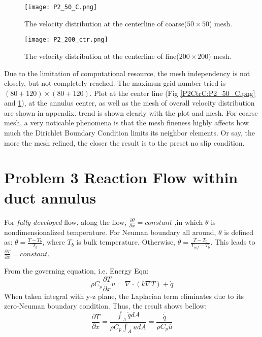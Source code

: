 \documentclass[a4paper,10pt]{report}
\begin{document}
\begin{figure}[ht]
\centering
\texttt{[image: P2\_50\_C.png]}
\caption{The velocity distribution at the centerline of coarse($50\times50$) mesh.}
\label{P2CtrC:P2_50_C.png}
\texttt{[image: P2\_200\_ctr.png]}
\caption{The velocity distribution at the centerline of fine($200 \times 200$) mesh.}
\label{P2CtrF:P2_200_ctr.png}
\end{figure}


Due to the limitation of computational resource, the mesh independency is not closely, but not completely reached. 
The maximun grid number tried is $(80+120) \times (80+120)$. Plot at the center line (Fig \ref{P2CtrC:P2_50_C.png} and 
\ref{P2CtrF:P2_200_ctr.png}), at the annulus center, as well as the mesh of overall velocity distribution are shown in appendix.
trend is shown clearly with the plot and mesh. 
For coarse mesh, a very noticable phenomena is that the mesh fineness highly affects how much the Dirichlet Boundary 
Condition limits its neighbor elements. Or say, the more the mesh refined, the closer the result is to the preset 
no slip condition.


\section{Problem 3 Reaction Flow within duct annulus}


For \emph{fully developed} flow, along the flow, $ \frac{\partial \theta}{\partial x} = constant $ ,in which $ \theta $ 
is nondimensionalized temperature. For Neuman boundary all around, $ \theta $ is defined as: $ \theta = \frac{T - T_b}{T_b}$, 
where $T_b$ is bulk temperature. Otherwise, $ \theta = \frac{T - T_b}{T_{ref} - T_b} $. This leads to $ \frac{\partial T}{\partial x} = constant $. 


From the governing equation, i.e. Energy Eqn:
\begin{equation}
 \rho C_p \frac{\partial T}{\partial x} u = \nabla \cdot ( k \nabla T ) + \dot q
\end{equation}
When taken integral with y-z plane, the Laplacian term eliminates due to its zero-Neuman boundary condition. Thus, the result 
shows bellow:
\begin{equation}
 \frac{\partial T}{\partial x} = \frac{\int_A \dot q dA}{\rho C_p \int_A u dA} = \frac{\overline{\dot q}}{\rho C_p \overline{u}}
\end{equation}
\end{document}
